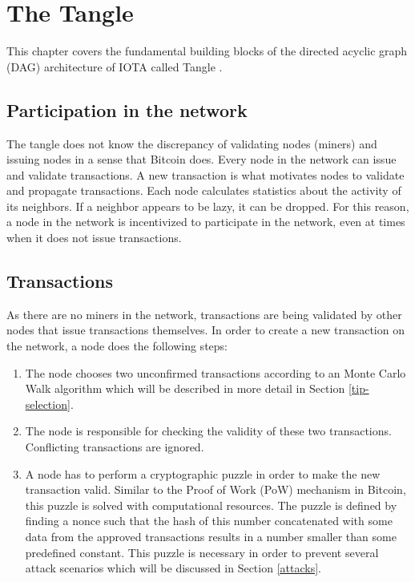 \chapter{The Tangle}
This chapter covers the fundamental building blocks of the directed acyclic graph (DAG) architecture of IOTA called Tangle \cite{the-tangle}.
\section{Participation in the network}
The tangle does not know the discrepancy of validating nodes (miners) and issuing nodes in a sense that Bitcoin does. Every node in the network can issue and validate transactions. A new transaction is  
what motivates nodes to validate and propagate transactions. Each node calculates statistics about the activity of its neighbors. If a neighbor appears to be lazy, it can be dropped. For this reason, a node in the network is incentivized to participate in the network, even at times when it does not issue transactions. 

\section{Transactions}
As there are no miners in the network, transactions are being validated by other nodes that issue transactions themselves. In order to create a new transaction on the network, a node does the following steps:
\begin{enumerate}
    \item The node chooses two unconfirmed transactions according to an Monte Carlo Walk algorithm which will be described in more detail in Section \ref{tip-selection}.
    \item The node is responsible for checking the validity of these two transactions. Conflicting transactions are ignored.
    \item A node has to perform a cryptographic puzzle in order to make the new transaction valid. Similar to the Proof of Work (PoW) mechanism in Bitcoin, this puzzle is solved with computational resources. The puzzle is defined by finding a nonce such that the hash of this number concatenated with some data from the approved transactions results in a number smaller than some predefined constant. This puzzle is necessary in order to prevent several attack scenarios which will be discussed in Section \ref{attacks}.
\end{enumerate}

